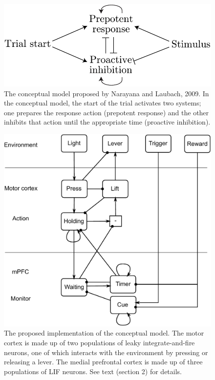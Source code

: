 \documentclass[12pt]{article}
\begin{document}
\clearpage

\begin{figure}
  \centering
    \includegraphics[width=\columnwidth]{f2-conceptual}
    \caption{The conceptual model proposed by Narayana and
      Laubach, 2009. In the conceptual model, the start of the
      trial activates two systems; one prepares the response
      action (prepotent response) and the other inhibits
      that action until the appropriate time (proactive inhibition).}
\end{figure}

\clearpage

\begin{figure}
  \centering
    \includegraphics[width=\columnwidth]{f3-fullmodel}
    \caption{The proposed implementation of the conceptual model.
      The motor cortex is made up of two populations of
      leaky integrate-and-fire neurons, one of which interacts
      with the environment by pressing or releasing a lever.
      The medial prefrontal cortex is made up of three
      populations of LIF neurons. See text (section 2) for details.}
\end{figure}
\end{document}
